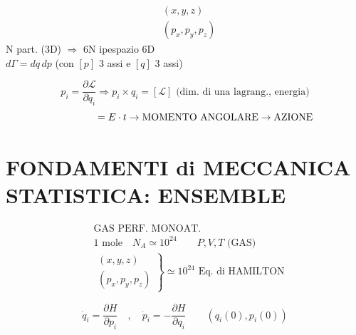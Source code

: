 \documentclass[12pt,a4paper]{article}
\begin{document}
\vspace{0.5cm}


\begin{align*}
    & (x, y, z) \\
    & (p_x, p_y, p_z)
\end{align*}
N part. (3D) $\Rightarrow$ 6N ipespazio 6D \\
$d\Gamma = dq \, dp$ (con $[p]$ 3 assi e $[q]$ 3 assi)

\vspace{0.5cm}
\begin{equation*}
    p_i = \frac{\partial \mathcal{L}}{\partial \dot{q}_i} \Rightarrow p_i \times q_i = [\mathcal{L}] \text{ (dim. di una lagrang., energia)}
\end{equation*}
\begin{equation*}
    \hphantom{p_i = \frac{\partial \mathcal{L}}{\partial \dot{q}_i}} = E \cdot t \rightarrow \text{MOMENTO ANGOLARE} \rightarrow \text{AZIONE}
\end{equation*}

\newpage
\section*{FONDAMENTI di MECCANICA STATISTICA: ENSEMBLE}


\begin{align*}
    & \text{GAS PERF. MONOAT.} \\
    & 1 \text{ mole} \quad N_A \simeq 10^{24} \qquad P, V, T \text{ (GAS)} \\
    & \left. \begin{matrix} (x, y, z) \\ (p_x, p_y, p_z) \end{matrix} \right\} \simeq 10^{24} \text{ Eq. di HAMILTON}
\end{align*}

\begin{equation*}
    \dot{q}_i = \frac{\partial H}{\partial p_i} \quad , \quad \dot{p}_i = -\frac{\partial H}{\partial q_i} \qquad (q_i(0), p_i(0))
\end{equation*}
\end{document}
